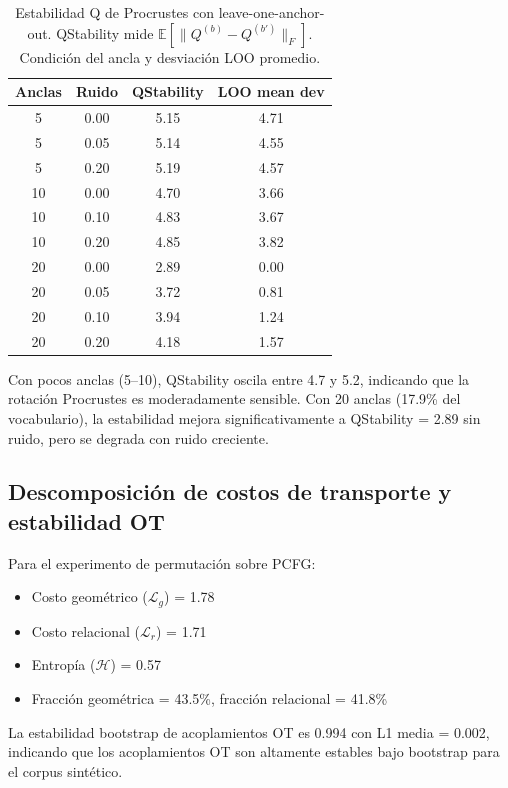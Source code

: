 \documentclass[11pt,a4paper]{article}
\newcommand{\E}{\mathbb{E}}
\newcommand{\1}{\mathbf{1}}
\numberwithin{equation}{section}
\begin{document}
\begin{table}[h]
\centering
\caption{Estabilidad Q de Procrustes con leave-one-anchor-out. QStability mide $\E[\|Q^{(b)} - Q^{(b')}\|_F]$. Condición del ancla y desviación LOO promedio.}
\label{tab:anchor_stab}
\begin{tabular}{cccc}
\toprule
Anclas & Ruido & QStability & LOO mean dev \\
\midrule
5 & 0.00 & 5.15 & 4.71 \\
5 & 0.05 & 5.14 & 4.55 \\
5 & 0.20 & 5.19 & 4.57 \\
10 & 0.00 & 4.70 & 3.66 \\
10 & 0.10 & 4.83 & 3.67 \\
10 & 0.20 & 4.85 & 3.82 \\
20 & 0.00 & 2.89 & 0.00 \\
20 & 0.05 & 3.72 & 0.81 \\
20 & 0.10 & 3.94 & 1.24 \\
20 & 0.20 & 4.18 & 1.57 \\
\bottomrule
\end{tabular}
\end{table}

Con pocos anclas (5--10), QStability oscila entre 4.7 y 5.2, indicando que la rotación Procrustes es moderadamente sensible. Con 20 anclas (17.9\% del vocabulario), la estabilidad mejora significativamente a QStability = 2.89 sin ruido, pero se degrada con ruido creciente.

\subsection{Descomposición de costos de transporte y estabilidad OT}

Para el experimento de permutación sobre PCFG:
\begin{itemize}
    \item Costo geométrico ($\mathcal{L}_g$) = 1.78
    \item Costo relacional ($\mathcal{L}_r$) = 1.71
    \item Entropía ($\mathcal{H}$) = 0.57
    \item Fracción geométrica = 43.5\%, fracción relacional = 41.8\%
\end{itemize}

La estabilidad bootstrap de acoplamientos OT es 0.994 con L1 media = 0.002, indicando que los acoplamientos OT son altamente estables bajo bootstrap para el corpus sintético.
\end{document}
